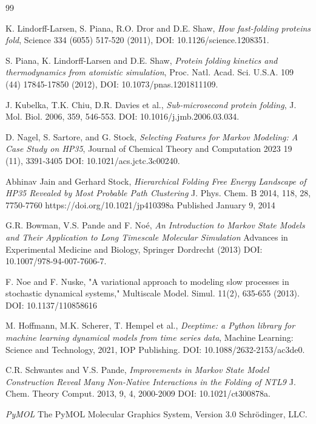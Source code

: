 \documentclass[prl,twocolumn]{revtex4-1}
\begin{document}
\begin{thebibliography}{99}
\setlength{\itemsep}{3pt}  %


    K. Lindorff-Larsen, S. Piana, R.O. Dror and D.E. Shaw,  
    \textit{How fast-folding proteins fold}, 
    Science 334 (6055) 517-520 (2011), 
    DOI: 10.1126/science.1208351.


    S. Piana, K. Lindorff-Larsen and D.E. Shaw,  
    \textit{Protein folding kinetics and thermodynamics from atomistic simulation}, 
    Proc. Natl. Acad. Sci. U.S.A. 109 (44) 17845-17850 (2012), 
    DOI: 10.1073/pnas.1201811109.

    J. Kubelka, T.K. Chiu, D.R. Davies et al.,
    \textit{Sub-microsecond protein folding},
    J. Mol. Biol. 2006, 359, 546-553.
    DOI: 10.1016/j.jmb.2006.03.034.


    D. Nagel, S. Sartore, and G. Stock,
    \textit{Selecting Features for Markov Modeling: A Case Study on HP35},
    Journal of Chemical Theory and Computation 2023 19 (11), 3391-3405
    DOI:  10.1021/acs.jctc.3c00240.

    Abhinav Jain and Gerhard Stock,
    \textit{Hierarchical Folding Free Energy Landscape of HP35 Revealed by
    Most Probable Path Clustering}
    J. Phys. Chem. B 2014, 118, 28, 7750-7760
    https://doi.org/10.1021/jp410398a
    Published January 9, 2014

    G.R. Bowman, V.S. Pande and F. Noé,
    \textit{An Introduction to Markov State Models and Their Application to Long Timescale Molecular Simulation}
    Advances in Experimental Medicine and Biology, Springer Dordrecht (2013)
    DOI:  10.1007/978-94-007-7606-7.

    F. Noe and F. Nuske, "A variational approach to modeling slow
    processes in stochastic dynamical systems," Multiscale Model.
    Simul. 11(2), 635-655 (2013). DOI: 10.1137/110858616


   M. Hoffmann, M.K. Scherer, T. Hempel et al.,
  \textit{Deeptime: a Python library for machine learning dynamical models from time series data},
  Machine Learning: Science and Technology, 2021, IOP Publishing.
DOI: 10.1088/2632-2153/ac3de0.


    C.R. Schwantes and V.S. Pande,
    \textit{Improvements in Markov State Model Construction Reveal Many Non-Native Interactions in the Folding of NTL9}
    J. Chem. Theory Comput. 2013, 9, 4, 2000-2009
    DOI: 10.1021/ct300878a.


    \textit{PyMOL}
    The PyMOL Molecular Graphics System, Version 3.0 Schrödinger, LLC.
\end{thebibliography}
%
%
%



\end{document}
